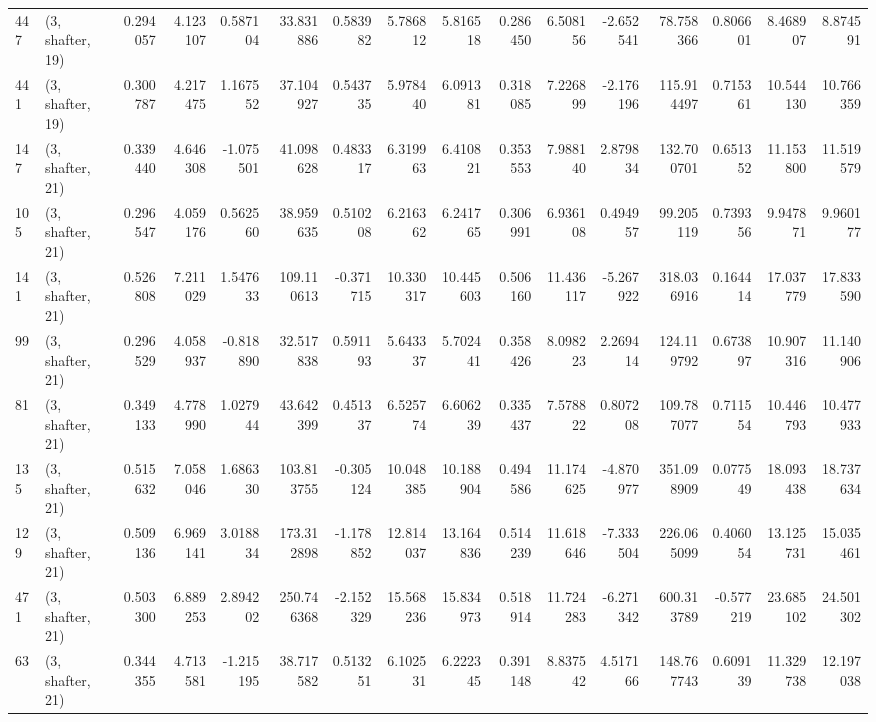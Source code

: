 \begin{tabular}{llrrrrrrrrrrrrrr}
447 &  (3, shafter, 19) &   0.294057 &   4.123107 &   0.587104 &    33.831886 &   0.583982 &   5.786812 &   5.816518 &  0.286450 &   6.508156 &  -2.652541 &     78.758366 &   0.806601 &   8.468907 &    8.874591 \\
441 &  (3, shafter, 19) &   0.300787 &   4.217475 &   1.167552 &    37.104927 &   0.543735 &   5.978440 &   6.091381 &  0.318085 &   7.226899 &  -2.176196 &    115.914497 &   0.715361 &  10.544130 &   10.766359 \\
147 &  (3, shafter, 21) &   0.339440 &   4.646308 &  -1.075501 &    41.098628 &   0.483317 &   6.319963 &   6.410821 &  0.353553 &   7.988140 &   2.879834 &    132.700701 &   0.651352 &  11.153800 &   11.519579 \\
105 &  (3, shafter, 21) &   0.296547 &   4.059176 &   0.562560 &    38.959635 &   0.510208 &   6.216362 &   6.241765 &  0.306991 &   6.936108 &   0.494957 &     99.205119 &   0.739356 &   9.947871 &    9.960177 \\
141 &  (3, shafter, 21) &   0.526808 &   7.211029 &   1.547633 &   109.110613 &  -0.371715 &  10.330317 &  10.445603 &  0.506160 &  11.436117 &  -5.267922 &    318.036916 &   0.164414 &  17.037779 &   17.833590 \\
99  &  (3, shafter, 21) &   0.296529 &   4.058937 &  -0.818890 &    32.517838 &   0.591193 &   5.643337 &   5.702441 &  0.358426 &   8.098223 &   2.269414 &    124.119792 &   0.673897 &  10.907316 &   11.140906 \\
81  &  (3, shafter, 21) &   0.349133 &   4.778990 &   1.027944 &    43.642399 &   0.451337 &   6.525774 &   6.606239 &  0.335437 &   7.578822 &   0.807208 &    109.787077 &   0.711554 &  10.446793 &   10.477933 \\
135 &  (3, shafter, 21) &   0.515632 &   7.058046 &   1.686330 &   103.813755 &  -0.305124 &  10.048385 &  10.188904 &  0.494586 &  11.174625 &  -4.870977 &    351.098909 &   0.077549 &  18.093438 &   18.737634 \\
129 &  (3, shafter, 21) &   0.509136 &   6.969141 &   3.018834 &   173.312898 &  -1.178852 &  12.814037 &  13.164836 &  0.514239 &  11.618646 &  -7.333504 &    226.065099 &   0.406054 &  13.125731 &   15.035461 \\
471 &  (3, shafter, 21) &   0.503300 &   6.889253 &   2.894202 &   250.746368 &  -2.152329 &  15.568236 &  15.834973 &  0.518914 &  11.724283 &  -6.271342 &    600.313789 &  -0.577219 &  23.685102 &   24.501302 \\
63  &  (3, shafter, 21) &   0.344355 &   4.713581 &  -1.215195 &    38.717582 &   0.513251 &   6.102531 &   6.222345 &  0.391148 &   8.837542 &   4.517166 &    148.767743 &   0.609139 &  11.329738 &   12.197038 \\

\end{tabular}
